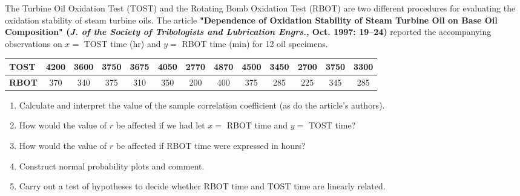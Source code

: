 \documentclass[11pt,letterpaper,boxed]{hmcpset}
\begin{document}
\begin{solution}
	\vfill
\end{solution}
\newpage


\begin{problem}[12.5.58]
	The Turbine Oil Oxidation Test (TOST) and the Rotating Bomb Oxidation Test (RBOT) are two different procedures for evaluating the oxidation stability of steam turbine oils. The article \textbf{"Dependence of Oxidation Stability of Steam Turbine Oil on Base Oil Composition" (\emph{J. of the Society of Tribologists and Lubrication Engrs.}, Oct. 1997: 19--24)} reported the accompanying observations on $x = $ TOST time (hr) and $y =$ RBOT time (min) for 12 oil specimens.
	\begin{center}
	\begin{tabular}{l | c c c c c c c c c c c c}
		\textbf{TOST} & 4200 & 3600 & 3750 & 3675 & 4050 & 2770 & 4870 & 4500 & 3450 & 2700 & 3750 & 3300\\
		\hline
		 \textbf{RBOT} & 370 & 340 & 375 & 310 & 350 & 200 & 400 & 375 & 285 & 225 & 345 & 285
	\end{tabular}
	\end{center}
	\begin{enumerate}
		\item
			Calculate and interpret the value of the sample correlation coefficient (as do the article's authors).
		\item
			How would the value of $r$ be affected if we had let $x =$ RBOT time and $y =$ TOST time?
		\item
			How would the value of $r$ be affected if RBOT time were expressed in hours?
		\item
			Construct normal probability plots and comment.
		\item
			Carry out a test of hypotheses to decide whether RBOT time and TOST time are linearly related.
	\end{enumerate}
\end{problem}

\begin{solution}
	\vfill
\end{solution}
\newpage

\end{document}
